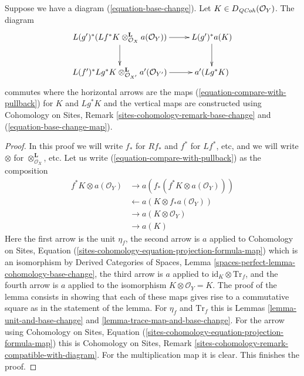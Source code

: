 \begin{lemma}
\label{lemma-restriction-compare-with-pullback}
Suppose we have a diagram (\ref{equation-base-change}).
Let $K \in D_{\mathit{QCoh}}(\mathcal{O}_Y)$. The diagram
$$
\xymatrix{
L(g')^*(Lf^*K \otimes^\mathbf{L}_{\mathcal{O}_X} a(\mathcal{O}_Y))
\ar[r] \ar[d] & L(g')^*a(K) \ar[d] \\
L(f')^*Lg^*K \otimes_{\mathcal{O}_{X'}}^\mathbf{L} a'(\mathcal{O}_{Y'})
\ar[r] & a'(Lg^*K)
}
$$
commutes where the horizontal arrows are the maps
(\ref{equation-compare-with-pullback}) for $K$ and $Lg^*K$
and the vertical maps are constructed using
Cohomology on Sites, Remark \ref{sites-cohomology-remark-base-change} and
(\ref{equation-base-change-map}).
\end{lemma}

\begin{proof}
In this proof we will write $f_*$ for $Rf_*$ and $f^*$ for $Lf^*$, etc,
and we will write $\otimes$ for $\otimes^\mathbf{L}_{\mathcal{O}_X}$, etc.
Let us write (\ref{equation-compare-with-pullback}) as the composition
\begin{align*}
f^*K \otimes a(\mathcal{O}_Y)
& \to
a(f_*(f^*K \otimes a(\mathcal{O}_Y))) \\
& \leftarrow
a(K \otimes f_*a(\mathcal{O}_Y)) \\
& \to
a(K \otimes \mathcal{O}_Y) \\
& \to
a(K)
\end{align*}
Here the first arrow is the unit $\eta_f$, the second arrow is $a$
applied to Cohomology on Sites, Equation
(\ref{sites-cohomology-equation-projection-formula-map}) which is an
isomorphism by Derived Categories of Spaces, Lemma
\ref{spaces-perfect-lemma-cohomology-base-change}, the third arrow is
$a$ applied to $\text{id}_K \otimes \text{Tr}_f$, and the fourth
arrow is $a$ applied to the isomorphism $K \otimes \mathcal{O}_Y = K$.
The proof of the lemma consists in showing that each of these
maps gives rise to a commutative square as in the statement of the lemma.
For $\eta_f$ and $\text{Tr}_f$ this is
Lemmas \ref{lemma-unit-and-base-change} and
\ref{lemma-trace-map-and-base-change}.
For the arrow using Cohomology on Sites, Equation
(\ref{sites-cohomology-equation-projection-formula-map})
this is Cohomology on Sites, Remark
\ref{sites-cohomology-remark-compatible-with-diagram}.
For the multiplication map it is clear. This finishes the proof.
\end{proof}











